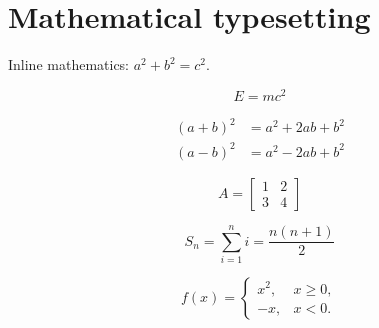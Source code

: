 \documentclass[12pt,a4paper]{article}
\begin{document}
\section{Mathematical typesetting}
Inline mathematics: \(a^2+b^2=c^2\).

\begin{equation}
    E = mc^2
\end{equation}

\begin{align}
    (a+b)^2 &= a^2+2ab+b^2 \\
    (a-b)^2 &= a^2-2ab+b^2
\end{align}

\[
A = \begin{bmatrix}
1 & 2 \\
3 & 4
\end{bmatrix}
\]

\[
S_n = \sum_{i=1}^{n} i = \frac{n(n+1)}{2}
\]

\[
f(x)=
\begin{cases}
x^2, & x \geq 0,\\
-x, & x < 0.
\end{cases}
\]
\end{document}
